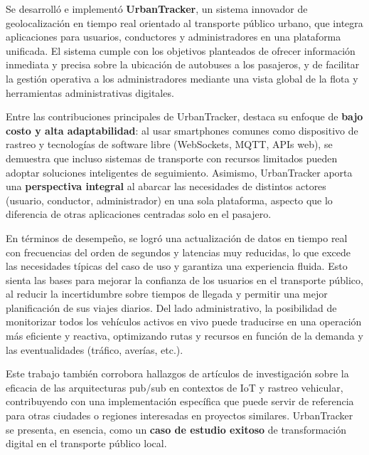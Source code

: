 Se desarrolló e implementó \textbf{UrbanTracker}, un sistema innovador de geolocalización en tiempo real orientado al transporte público urbano, que integra aplicaciones para usuarios, conductores y administradores en una plataforma unificada. El sistema cumple con los objetivos planteados de ofrecer información inmediata y precisa sobre la ubicación de autobuses a los pasajeros, y de facilitar la gestión operativa a los administradores mediante una vista global de la flota y herramientas administrativas digitales.

Entre las contribuciones principales de UrbanTracker, destaca su enfoque de \textbf{bajo costo y alta adaptabilidad}: al usar smartphones comunes como dispositivo de rastreo y tecnologías de software libre (WebSockets, MQTT, APIs web), se demuestra que incluso sistemas de transporte con recursos limitados pueden adoptar soluciones inteligentes de seguimiento. Asimismo, UrbanTracker aporta una \textbf{perspectiva integral} al abarcar las necesidades de distintos actores (usuario, conductor, administrador) en una sola plataforma, aspecto que lo diferencia de otras aplicaciones centradas solo en el pasajero.

En términos de desempeño, se logró una actualización de datos en tiempo real con frecuencias del orden de segundos y latencias muy reducidas, lo que excede las necesidades típicas del caso de uso y garantiza una experiencia fluida. Esto sienta las bases para mejorar la confianza de los usuarios en el transporte público, al reducir la incertidumbre sobre tiempos de llegada y permitir una mejor planificación de sus viajes diarios. Del lado administrativo, la posibilidad de monitorizar todos los vehículos activos en vivo puede traducirse en una operación más eficiente y reactiva, optimizando rutas y recursos en función de la demanda y las eventualidades (tráfico, averías, etc.).

Este trabajo también corrobora hallazgos de artículos de investigación sobre la eficacia de las arquitecturas pub/sub en contextos de IoT y rastreo vehicular, contribuyendo con una implementación específica que puede servir de referencia para otras ciudades o regiones interesadas en proyectos similares. UrbanTracker se presenta, en esencia, como un \textbf{caso de estudio exitoso} de transformación digital en el transporte público local.

